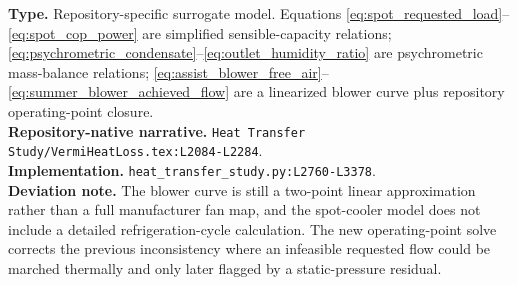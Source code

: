 \documentclass[11pt]{article}
\newcommand{\srcref}[1]{\nolinkurl{#1}}
\newcommand{\filepath}[1]{\nolinkurl{#1}}
\begin{document}
\textbf{Type.} Repository-specific surrogate model. Equations \eqref{eq:spot_requested_load}--\eqref{eq:spot_cop_power} are simplified sensible-capacity relations; \eqref{eq:psychrometric_condensate}--\eqref{eq:outlet_humidity_ratio} are psychrometric mass-balance relations; \eqref{eq:assist_blower_free_air}--\eqref{eq:summer_blower_achieved_flow} are a linearized blower curve plus repository operating-point closure. \\
\textbf{Repository-native narrative.} \filepath{Heat Transfer Study/VermiHeatLoss.tex:L2084-L2284}. \\
\textbf{Implementation.} \srcref{heat_transfer_study.py:L2760-L3378}. \\
\textbf{Deviation note.} The blower curve is still a two-point linear approximation rather than a full manufacturer fan map, and the spot-cooler model does not include a detailed refrigeration-cycle calculation. The new operating-point solve corrects the previous inconsistency where an infeasible requested flow could be marched thermally and only later flagged by a static-pressure residual.
\end{document}
